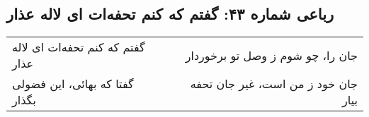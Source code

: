 \begin{center}
\section*{رباعی شماره ۴۳: گفتم که کنم تحفه‌ات ای لاله عذار}
\label{sec:043}
\begin{longtable}{l p{0.5cm} r}
گفتم که کنم تحفه‌ات ای لاله عذار
&&
جان را، چو شوم ز وصل تو برخوردار
\\
گفتا که بهائی، این فضولی بگذار
&&
جان خود ز من است، غیر جان تحفه بیار
\\
\end{longtable}
\end{center}
